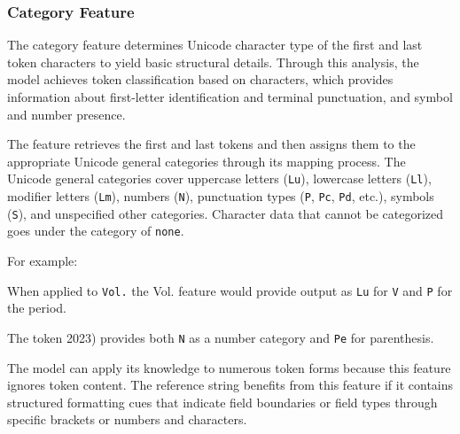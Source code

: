 \subsubsection{Category Feature}
The category feature determines Unicode character type of the first and last token characters to yield basic structural details. Through this analysis, the model achieves token classification based on characters, which provides information about first-letter identification and terminal punctuation, and symbol and number presence.

The feature retrieves the first and last tokens and then assigns them to the appropriate Unicode general categories through its mapping process. The Unicode general categories cover uppercase letters (\texttt{Lu}), lowercase letters (\texttt{Ll}), modifier letters (\texttt{Lm}), numbers (\texttt{N}), punctuation types (\texttt{P}, \texttt{Pc}, \texttt{Pd}, etc.), symbols (\texttt{S}), and unspecified other categories. Character data that cannot be categorized goes under the category of \texttt{none}.

For example:
\begin{compactitem}
\item When applied to \texttt{Vol.} the Vol. feature would provide output as \texttt{Lu} for \texttt{V} and \texttt{P} for the period.
\item The token 2023) provides both \texttt{N} as a number category and \texttt{Pe} for parenthesis.
\end{compactitem}
The model can apply its knowledge to numerous token forms because this feature ignores token content. The reference string benefits from this feature if it contains structured formatting cues that indicate field boundaries or field types through specific brackets or numbers and characters.

